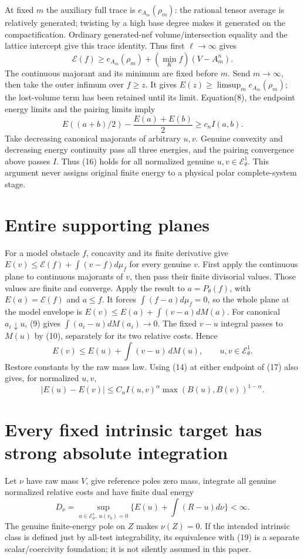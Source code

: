 \documentclass[11pt]{article}
\newcommand{\EE}{\mathcal E^1_\theta}
\begin{document}
At fixed $m$ the auxiliary full trace is $e_{A_m}(\rho_m)$:
the rational tensor average is relatively generated; twisting by a
high base degree makes it generated on the compactification.
Ordinary generated-nef volume/intersection equality and the lattice
intercept give this trace identity. Thus first $\ell\to\infty$ gives
\[
 \mathscr E(f)\geq e_{A_m}(\rho_m)
                           +(\min_K f)(V-A_m^n).          \tag{15}
\]
The continuous majorant and its minimum are fixed before $m$.
Send $m\to\infty$, then take the outer infimum over $f\geq z$.
It gives $E(z)\geq\limsup_me_{A_m}(\rho_m)$; the lost-volume term
has been retained until its limit. Equation(8), the endpoint energy
limits and the pairing limits imply
\[
 E((a+b)/2)-\frac{E(a)+E(b)}2\geq c_nI(a,b).               \tag{16}
\]
Take decreasing canonical majorants of arbitrary $u,v$.
Genuine convexity and decreasing energy continuity pass all three
energies, and the pairing convergence above passes $I$.
Thus (16) holds for all normalized genuine $u,v\in\EE$.
This argument never assigns original finite energy to a physical
polar complete-system stage.

\section{Entire supporting planes}
For a model obstacle $f$, concavity and its finite derivative give
$E(v)\leq\mathscr E(f)+\int(v-f)d\mu_f$ for every genuine $v$.
First apply the continuous plane to continuous majorants of $v$, then
pass their finite divisorial values. Those values are finite and
converge. Apply the result to $a=P_\theta(f)$, with
$E(a)=\mathscr E(f)$ and $a\leq f$. It forces
$\int(f-a)d\mu_f=0$, so the whole plane at the model envelope is
$E(v)\leq E(a)+\int(v-a)dM(a)$.
For canonical $a_i\downarrow u$, (9) gives
$\int(a_i-u)dM(a_i)\to0$. The fixed $v-u$ integral passes to $M(u)$
by (10), separately for its two relative costs. Hence
\[
 E(v)\leq E(u)+\int(v-u)\,dM(u),\qquad u,v\in\EE.         \tag{17}
\]
Restore constants by the raw mass law. Using (14) at either endpoint
of (17) also gives, for normalized $u,v$,
\[
 |E(u)-E(v)|\leq C_n I(u,v)^\alpha
                        \max(B(u),B(v))^{1-\alpha}.       \tag{18}
\]

\section{Every fixed intrinsic target has strong absolute integration}
Let $\nu$ have raw mass $V$, give reference poles zero mass, integrate
all genuine normalized relative costs and have finite dual energy
\[
 D_\nu=\sup_{u\in\EE,\ u(v_0)=0}
                  \{E(u)+\int(R-u)d\nu\}<\infty.          \tag{19}
\]
The genuine finite-energy pole on $Z$ makes $\nu(Z)=0$.
If the intended intrinsic class is defined just by all-test
integrability, its equivalence with (19) is a separate scalar/coercivity
foundation; it is not silently assumed in this paper.
\end{document}

